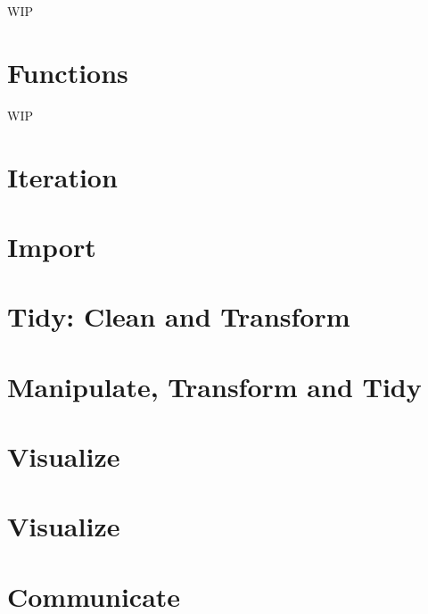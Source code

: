 \documentclass[]{book}
\begin{document}
WIP

\hypertarget{functions}{%
\chapter{Functions}\label{functions}}

WIP

\hypertarget{iteration}{%
\chapter{Iteration}\label{iteration}}

\hypertarget{import}{%
\chapter{Import}\label{import}}

\hypertarget{tidy-clean-and-transform}{%
\chapter{Tidy: Clean and Transform}\label{tidy-clean-and-transform}}

\hypertarget{manipulate-transform-and-tidy}{%
\chapter{Manipulate, Transform and Tidy}\label{manipulate-transform-and-tidy}}

\hypertarget{visualize}{%
\chapter{Visualize}\label{visualize}}

\hypertarget{visualize-1}{%
\chapter{Visualize}\label{visualize-1}}

\hypertarget{communicate}{%
\chapter{Communicate}\label{communicate}}


\end{document}
